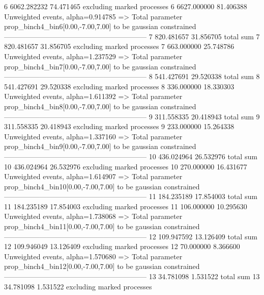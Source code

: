 6          6062.282232     74.471465       excluding marked processes    
6          6627.000000     81.406388       Unweighted events, alpha=0.914785
  => Total parameter prop_binch4_bin6[0.00,-7.00,7.00] to be gaussian constrained
------------------------------------------------------------
7          820.481657      31.856705       total sum                     
7          820.481657      31.856705       excluding marked processes    
7          663.000000      25.748786       Unweighted events, alpha=1.237529
  => Total parameter prop_binch4_bin7[0.00,-7.00,7.00] to be gaussian constrained
------------------------------------------------------------
8          541.427691      29.520338       total sum                     
8          541.427691      29.520338       excluding marked processes    
8          336.000000      18.330303       Unweighted events, alpha=1.611392
  => Total parameter prop_binch4_bin8[0.00,-7.00,7.00] to be gaussian constrained
------------------------------------------------------------
9          311.558335      20.418943       total sum                     
9          311.558335      20.418943       excluding marked processes    
9          233.000000      15.264338       Unweighted events, alpha=1.337160
  => Total parameter prop_binch4_bin9[0.00,-7.00,7.00] to be gaussian constrained
------------------------------------------------------------
10         436.024964      26.532976       total sum                     
10         436.024964      26.532976       excluding marked processes    
10         270.000000      16.431677       Unweighted events, alpha=1.614907
  => Total parameter prop_binch4_bin10[0.00,-7.00,7.00] to be gaussian constrained
------------------------------------------------------------
11         184.235189      17.854003       total sum                     
11         184.235189      17.854003       excluding marked processes    
11         106.000000      10.295630       Unweighted events, alpha=1.738068
  => Total parameter prop_binch4_bin11[0.00,-7.00,7.00] to be gaussian constrained
------------------------------------------------------------
12         109.947592      13.126409       total sum                     
12         109.946049      13.126409       excluding marked processes    
12         70.000000       8.366600        Unweighted events, alpha=1.570680
  => Total parameter prop_binch4_bin12[0.00,-7.00,7.00] to be gaussian constrained
------------------------------------------------------------
13         34.781098       1.531522        total sum                     
13         34.781098       1.531522        excluding marked processes    
